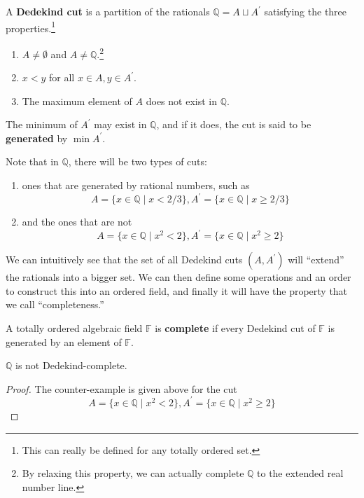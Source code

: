 \documentclass{article}
\begin{document}
      \begin{definition} 
        A \textbf{Dedekind cut} is a partition of the rationals $\mathbb{Q} = A \sqcup A^\prime$ satisfying the three properties.\footnote{This can really be defined for any totally ordered set. } 
        \begin{enumerate}
          \item $A \neq \emptyset$ and $A \neq \mathbb{Q}$.\footnote{By relaxing this property, we can actually complete $\mathbb{Q}$ to the extended real number line. }
          \item $x < y$ for all $x \in A, y \in A^\prime$. 
          \item The maximum element of $A$ does not exist in $\mathbb{Q}$. 
        \end{enumerate}
        The minimum of $A^\prime$ may exist in $\mathbb{Q}$, and if it does, the cut is said to be \textbf{generated} by $\min A^\prime$. 
      \end{definition}

      Note that in $\mathbb{Q}$, there will be two types of cuts: 
      \begin{enumerate}
        \item ones that are generated by rational numbers, such as 
        \begin{equation}
          A = \{x \in \mathbb{Q} \mid x < 2/3 \}, A^\prime = \{ x \in \mathbb{Q} \mid x \geq 2/3 \} 
        \end{equation}
        \item and the ones that are not 
        \begin{equation}
          A = \{x \in \mathbb{Q} \mid x^2 < 2 \}, A^\prime = \{x \in \mathbb{Q} \mid x^2 \geq 2 \}
        \end{equation}
      \end{enumerate}
      We can intuitively see that the set of all Dedekind cuts $(A, A^\prime)$ will ``extend'' the rationals into a bigger set. We can then define some operations and an order to construct this into an ordered field, and finally it will have the property that we call ``completeness.''

      \begin{definition}
        A totally ordered algebraic field $\mathbb{F}$ is \textbf{complete} if every Dedekind cut of $\mathbb{F}$ is generated by an element of $\mathbb{F}$. 
      \end{definition} 

      \begin{theorem}
        $\mathbb{Q}$ is not Dedekind-complete. 
      \end{theorem}
      \begin{proof}
        The counter-example is given above for the cut 
        \begin{equation}
          A = \{x \in \mathbb{Q} \mid x^2 < 2 \}, A^\prime = \{x \in \mathbb{Q} \mid x^2 \geq 2 \}
        \end{equation}
      \end{proof} 
\end{document}
